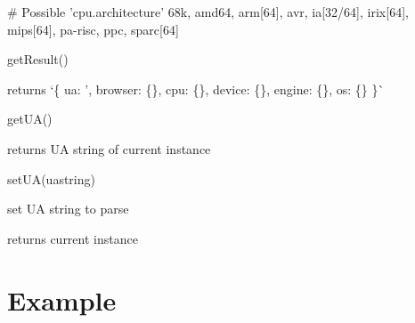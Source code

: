 \begin{DoxyCode}
# Possible 'cpu.architecture'
68k, amd64, arm[64], avr, ia[32/64], irix[64], mips[64], pa-risc, ppc, sparc[64]
\end{DoxyCode}



\begin{DoxyItemize}
\item {\ttfamily get\+Result()}
\begin{DoxyItemize}
\item returns `\{ ua\+: '\textquotesingle{}, browser\+: \{\}, cpu\+: \{\}, device\+: \{\}, engine\+: \{\}, os\+: \{\} \}\`{}
\end{DoxyItemize}
\item {\ttfamily get\+U\+A()}
\begin{DoxyItemize}
\item returns UA string of current instance
\end{DoxyItemize}
\item {\ttfamily set\+U\+A(uastring)}
\begin{DoxyItemize}
\item set UA string to parse
\item returns current instance
\end{DoxyItemize}
\end{DoxyItemize}

\section*{Example}


